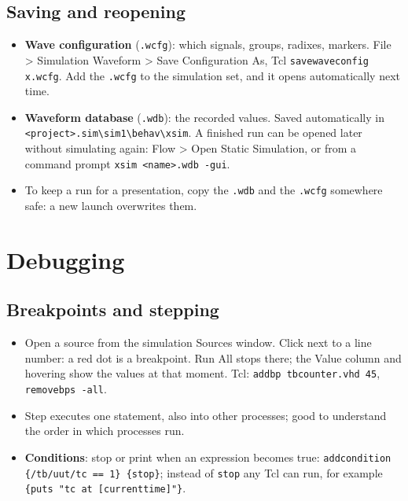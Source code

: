 \documentclass[11pt,a4paper]{article}
\newcommand{\code}[1]{\texttt{#1}}
\newcommand{\bs}{\textbackslash\allowbreak{}}
\renewcommand{\_}{\oldunderscore\allowbreak{}}
\newcommand{\menu}[1]{\textsf{#1}}
\begin{document}
\subsection{Saving and reopening}
\begin{itemize}[nosep]
  \item \textbf{Wave configuration} (\code{.wcfg}): which signals, groups, radixes, markers. \menu{File > Simulation Waveform > Save Configuration As}, Tcl \code{save\_wave\_config x.wcfg}. Add the \code{.wcfg} to the simulation set, and it opens automatically next time.
  \item \textbf{Waveform database} (\code{.wdb}): the recorded values. Saved automatically in \code{<project>.sim\bs sim\_1\bs behav\bs xsim}. A finished run can be opened later without simulating again: \menu{Flow > Open Static Simulation}, or from a command prompt \code{xsim <name>.wdb -gui}.
  \item To keep a run for a presentation, copy the \code{.wdb} and the \code{.wcfg} somewhere safe: a new launch overwrites them.
\end{itemize}

\section{Debugging}\label{sec:debug}

\subsection{Breakpoints and stepping}
\begin{itemize}[nosep]
  \item Open a source from the simulation Sources window. Click next to a line number: a red dot is a breakpoint. \menu{Run All} stops there; the Value column and hovering show the values at that moment. Tcl: \code{add\_bp tb\_counter.vhd 45}, \code{remove\_bps -all}.
  \item \menu{Step} executes one statement, also into other processes; good to understand the order in which processes run.
  \item \textbf{Conditions}: stop or print when an expression becomes true: \code{add\_condition \{/tb/uut/tc == 1\} \{stop\}}; instead of \code{stop} any Tcl can run, for example \code{\{puts "tc at [current\_time]"\}}.
\end{itemize}
\end{document}
